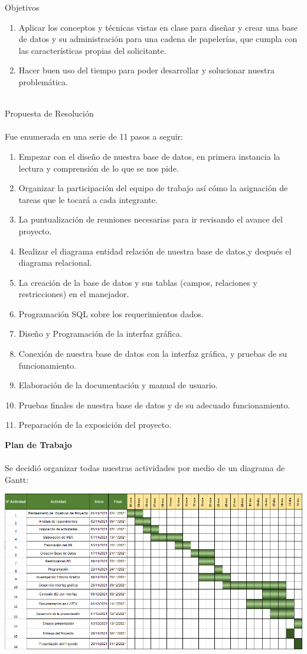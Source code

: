 \documentclass[letter,12pt]{article} %
\begin{document}
Objetivos
\begin{enumerate}
\item Aplicar los conceptos y técnicas vistas en clase para diseñar y crear una base de datos y su administración para una cadena de papelerías, que cumpla con las características propias del solicitante.
\item Hacer buen uso del tiempo para poder desarrollar y solucionar nuestra problemática.
\\\\
\end{enumerate}
Propuesta de Resolución
\\\\
Fue enumerada en una serie de 11 pasos a seguir:
\begin{enumerate}
\item Empezar con el diseño de nuestra base de datos, en primera instancia la lectura y comprensión de lo que se nos pide.
\item Organizar la participación del equipo de trabajo así cómo la asignación de tareas que le tocará a cada integrante.
\item La puntualización de reuniones necesarias para ir revisando el avance del proyecto. 
\item Realizar el diagrama entidad relación de nuestra base de datos,y después el diagrama relacional.
\item La creación de la base de datos y sus tablas (campos, relaciones y restricciones) en el manejador.
\item Programación SQL sobre los requerimientos dados.
\item Diseño y Programación de la interfaz gráfica.
\item Conexión de nuestra base de datos con la interfaz gráfica, y pruebas de su funcionamiento.
\item Elaboración de la documentación y manual de usuario.
\item Pruebas finales de nuestra base de datos y de su adecuado funcionamiento.
\item Preparación de la exposición del proyecto.
\end{enumerate}
\newpage
\large{ \textbf{Plan de Trabajo}}
\\\\
Se decidió organizar todas nuestras actividades por medio de un diagrama de Gantt:
\begin{center} 
\includegraphics[scale=0.64]{imagenes/DGANTT.png}
\end{center}
\end{document}
